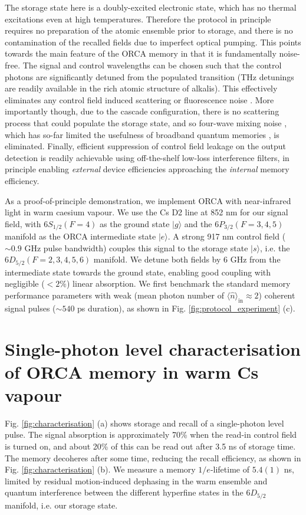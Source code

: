 \documentclass[%
 reprint,
 amsmath,amssymb,
 aps,
 pra,
]{revtex4-1}
\begin{document}
The storage state here is a doubly-excited electronic state, which has no thermal excitations even at high temperatures. Therefore the protocol in principle requires no preparation of the atomic ensemble prior to storage, and there is no contamination of the recalled fields due to imperfect optical pumping. This points towards the main feature of the ORCA memory in that it is fundamentally noise-free. The signal and control wavelengths can be chosen such that the control photons are significantly detuned from the populated transition (THz detunings are readily available in the rich atomic structure of alkalis). This effectively eliminates any control field induced scattering or fluorescence noise \cite{Raymer1977}. More importantly though, due to the cascade configuration, there is no scattering process that could populate the storage state, and so four-wave mixing noise \cite{Nunn2017}, which has so-far limited the usefulness of broadband quantum memories \cite{Michelberger2015}, is eliminated. Finally, efficient suppression of control field leakage on the output detection is readily achievable using off-the-shelf low-loss interference filters, in principle enabling \emph{external} device efficiencies approaching the \emph{internal} memory efficiency. 

As a proof-of-principle demonstration, we implement ORCA with near-infrared light in warm caesium vapour. We use the Cs D2 line at 852 nm for our signal field, with $6S_{1/2}(F=4)$ as the ground state $|g\rangle$ and the $6P_{3/2}(F=3,4,5)$ manifold as the ORCA intermediate state $|e\rangle$. A strong 917 nm control field ($\sim0.9$ GHz pulse bandwidth) couples this signal to the storage state $|s\rangle$, i.e. the $6D_{5/2}(F=2,3,4,5,6)$ manifold. We detune both fields by 6 GHz from the intermediate state towards the ground state, enabling good coupling with negligible ($<2\%$) linear absorption. We first benchmark the standard memory performance parameters with weak (mean photon number of $\langle\hat{n}\rangle_\mathrm{in}\approx{2}$) coherent signal pulses ($\sim540$ ps duration), as shown in Fig. \ref{fig:protocol_experiment} (c).

\section{Single-photon level characterisation of ORCA memory in warm Cs vapour}

Fig. \ref{fig:characterisation} (a) shows storage and recall of a single-photon level pulse. The signal absorption is approximately 70\% when the read-in control field is turned on, and about 20\% of this can be read out after 3.5 ns of storage time. The memory decoheres after some time, reducing the recall efficiency, as shown in Fig. \ref{fig:characterisation} (b). We measure a memory $1/e$-lifetime of $5.4(1)$ ns, limited by residual motion-induced dephasing in the warm ensemble and quantum interference between the different hyperfine states in the $6D_{5/2}$ manifold, i.e. our storage state.
\end{document}
